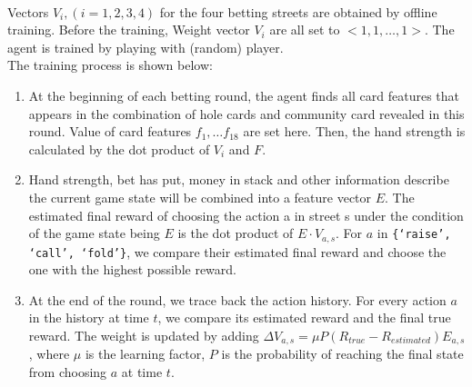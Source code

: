 \documentclass{article}
\begin{document}
\\Vectors $V_i, (i = 1, 2, 3, 4)$ for the four betting streets are obtained by offline training. 
Before the training, Weight vector $V_i$ are all set to $<1, 1, …, 1>$. The agent is trained by playing with (random) player.
\\The training process is shown below:
\begin{enumerate}
	\item At the beginning of each betting round, the agent finds all card features that appears in the combination of hole cards and community card revealed in this round. Value of card features $f_1, … f_{18}$ are set here. Then, the hand strength is calculated by the dot product of $V_i$ and $F$.
	\item Hand strength, bet has put, money in stack and other information describe the current game state will be combined into a feature vector $E$. The estimated final reward of choosing the action a in street s under the condition of the game state being $E$ is the dot product of $E\cdot V_{a, s}$.  For $a$ in \verb|{‘raise’, ‘call’, ‘fold’}|, we compare their estimated final reward and choose the one with the highest possible reward.
	\item At the end of the round, we trace back the action history. For every action $a$ in the history at time $t$, we compare its estimated reward and the final true reward. The weight is updated by adding $\Delta V_{a, s} = \mu P(R_{true} - R_{estimated})E_{a, s}$ , where $\mu$ is the learning factor, $P$ is the probability of reaching the final state from choosing $a$ at time $t$. 
\end{enumerate}
\end{document}
